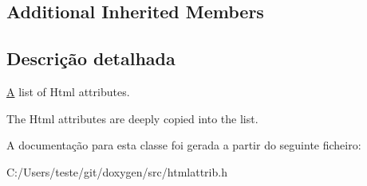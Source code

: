 \subsection*{Additional Inherited Members}


\subsection{Descrição detalhada}
\hyperlink{class_a}{A} list of Html attributes. 

The Html attributes are deeply copied into the list. 

A documentação para esta classe foi gerada a partir do seguinte ficheiro\-:\begin{DoxyCompactItemize}
\item 
C\-:/\-Users/teste/git/doxygen/src/htmlattrib.\-h\end{DoxyCompactItemize}
